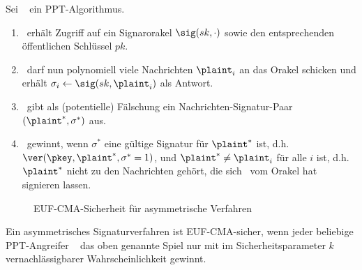 \begin{definition}
Sei \A~ ein PPT-Algorithmus.
\begin{enumerate}
\item \A~erhält Zugriff auf ein Signarorakel $\sig(sk, \cdot)$ sowie den
  entsprechenden öffentlichen Schlüssel $pk$.
\item \A~darf nun polynomiell viele Nachrichten $\plaint_i$ an das
  Orakel schicken und erhält $\sigma_i \leftarrow \sig(sk, \plaint_i)$ als Antwort.
\item \A~gibt als (potentielle) Fälschung ein Nachrichten-Signatur-Paar
  $(\plaint^*,\sigma^*)$ aus.
\item \A~gewinnt, wenn $\sigma^*$ eine gültige Signatur für
  $\plaint^*$ ist, d.h. $\ver(\pkey, \plaint^*, \sigma^* = 1)$, und $\plaint^*
  \neq \plaint_i$ für alle $i$ ist, d.h. $\plaint^*$ nicht zu den
  Nachrichten gehört, die sich \A~vom Orakel hat signieren lassen.
\end{enumerate} 

\begin{figure}
\begin{center}
  \caption{EUF-CMA-Sicherheit für asymmetrische Verfahren}
  \label{abb:euf-cma-asym}
\end{center}
\end{figure}

Ein asymmetrisches Signaturverfahren ist EUF-CMA-sicher, wenn jeder
beliebige PPT-Angreifer \A~ das oben genannte Spiel nur mit im
Sicherheitsparameter $k$ vernachlässigbarer Wahrscheinlichkeit gewinnt. 
\end{definition}

